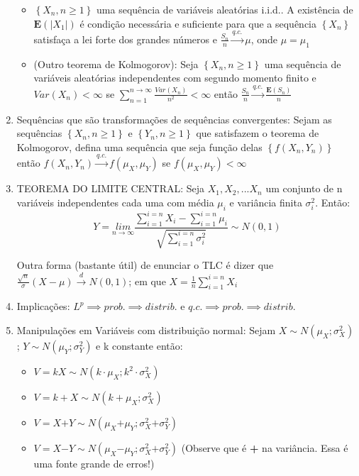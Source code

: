 \documentclass[english]{article}
\begin{document}
\begin{enumerate}
\begin{itemize}
\item $\left\{ X_{n},n\ge1\right\} $ uma sequência de variáveis aleatórias
i.i.d.. A existência de $\mathbf{E}(\left|X_{1}\right|)$ é condição
necessária e suficiente para que a sequência $\left\{ X_{n}\right\} $
satisfaça a lei forte dos grandes números e $\frac{S_{n}}{n}\overset{q.c.}{\to}\mu$,
onde $\mu=\mu_{1}$
\item (Outro teorema de Kolmogorov): Seja $\left\{ X_{n},n\ge1\right\} $
uma sequência de variáveis aleatórias independentes com segundo momento
finito e $Var(X_{n})<\infty$ se $\sum_{n=1}^{n\to\infty}\frac{Var(X_{n})}{n^{2}}<\infty$
então $\frac{S_{n}}{n}\overset{q.c.}{\to}\frac{\mathbf{E}(S_{n})}{n}$
\end{itemize}
\item Sequências que são transformações de sequências convergentes: Sejam
as sequências $\left\{ X_{n},n\ge1\right\} $ e $\left\{ Y_{n},n\ge1\right\} $
que satisfazem o teorema de Kolmogorov, defina uma sequência que seja
função delas $\left\{ f(X_{n},Y_{n})\right\} $ então $f(X_{n},Y_{n})\overset{q.c.}{\to}f(\mu_{X},\mu_{Y})$
se $f(\mu_{X},\mu_{Y})<\infty$
\item TEOREMA DO LIMITE CENTRAL: Seja $X_{1},X_{2},...X_{n}$ um conjunto
de n variáveis independentes cada uma com média $\mu_{i}$ e variância
finita $\sigma_{i}^{2}$. Então:
\[
Y=\underset{n\to\infty}{lim}\frac{\sum_{i=1}^{i=n}X_{i}-\sum_{i=1}^{i=n}\mu_{i}}{\sqrt{\sum_{i=1}^{i=n}\sigma_{i}^{2}}}\sim N(0,1)
\]



Outra forma (bastante útil) de enunciar o TLC é dizer que $\frac{\sqrt{n}}{\sigma}(X-\mu)\overset{d}{\to}N(0,1)$;
em que $X=\frac{1}{n}\sum_{i=1}^{i=n}X_{i}$

\item Implicações: $L^{p}\implies prob.\implies distrib.$ e $q.c.\implies prob.\implies distrib.$
\item Manipulações em Variáveis com distribuição normal: Sejam $X\sim N(\mu_{X};\sigma_{X}^{2})$
; $Y\sim N(\mu_{Y};\sigma_{Y}^{2})$ e k constante então:

\begin{itemize}
\item $V=kX\sim N(k\cdot\mu_{X};k^{2}\cdot\sigma_{X}^{2})$
\item $V=k+X\sim N(k+\mu_{X};\sigma_{X}^{2})$
\item $V=X\mathbf{+}Y\sim N(\mu_{X}\mathbf{+}\mu_{Y};\sigma_{X}^{2}\mathbf{+}\sigma_{Y}^{2})$
\item $V=X\mathbf{-}Y\sim N(\mu_{X}\mathbf{-}\mu_{Y};\sigma_{X}^{2}\mathbf{+}\sigma_{Y}^{2})$
(Observe que é \textbf{+} na variância. Essa é uma fonte grande de
erros!)
\end{itemize}
\end{enumerate}
\pagebreak{}
\end{document}
